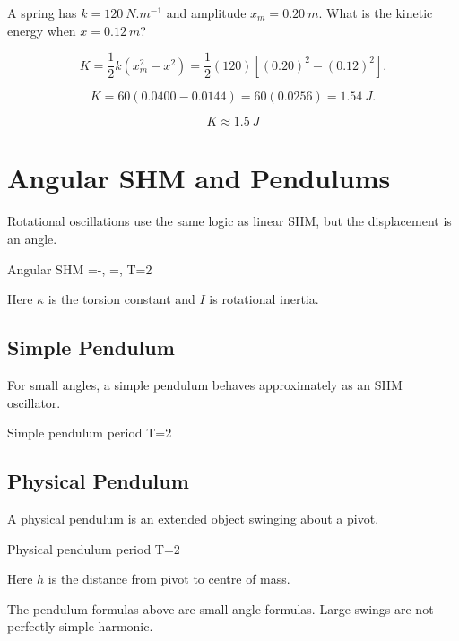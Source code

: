 \documentclass{studentnotes}
\begin{document}
A spring has \(k=\SI{120}{N.m^{-1}}\) and amplitude \(x_m=\SI{0.20}{m}\).
What is the kinetic energy when \(x=\SI{0.12}{m}\)?

\[
    K=\frac{1}{2}k(x_m^2-x^2)
      =
      \frac{1}{2}(120)\left[(0.20)^2-(0.12)^2\right].
\]

\[
    K=60(0.0400-0.0144)=60(0.0256)=\SI{1.54}{J}.
\]

\[
    \boxed{K\approx\SI{1.5}{J}}
\]

\section{Angular SHM and Pendulums}

Rotational oscillations use the same logic as linear SHM, but the displacement is
an angle.

\begin{namedformula}{Angular SHM}
    \tau=-\kappa\theta,
    \qquad
    \omega=,
    \qquad
    T=2\pi{}
\end{namedformula}

Here \(\kappa\) is the torsion constant and \(I\) is rotational inertia.

\subsection{Simple Pendulum}

For small angles, a simple pendulum behaves approximately as an SHM oscillator.

\begin{namedformula}{Simple pendulum period}
    T=2\pi{}
\end{namedformula}

\subsection{Physical Pendulum}

A physical pendulum is an extended object swinging about a pivot.

\begin{namedformula}{Physical pendulum period}
    T=2\pi{}
\end{namedformula}

Here \(h\) is the distance from pivot to centre of mass.

\begin{importantnote}
    The pendulum formulas above are small-angle formulas. Large swings are not
    perfectly simple harmonic.
\end{importantnote}
\end{document}
